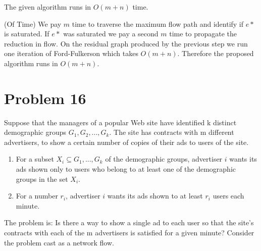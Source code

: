\documentclass{amsart}
\theoremstyle{definition}
\theoremstyle{remark}
\numberwithin{equation}{section}
\begin{document}
\claimstar The given algorithm runs in $O(m+n)$ time.

\proof (Of Time) We pay $m$ time to traverse the maximum flow path and identify if $e*$ is saturated. If $e*$ was saturated we pay a second $m$ time to propagate the reduction in flow. On the residual graph produced by the previous step we run one iteration of Ford-Fulkerson which takes $O(m+n)$. Therefore the proposed algorithm runs in $O(m+n)$.

\section{Problem 16}
Suppose that the managers of a popular Web site have identified k distinct demographic groups $G_1, G_2, . . . , G_k$. The site has contracts with m different advertisers, to show a certain number of copies of their ads to users of the site.

\begin{enumerate}
  \item For a subset $X_i \subseteq {G_1, . . . , G_k}$ of the demographic groups, advertiser $i$ wants its ads shown only to users who belong to at least one of the demographic groups in the set $X_i$.
  \item For a number $r_i$, advertiser $i$ wants its ads shown to at least $r_i$ users each minute.
\end{enumerate}

The problem is: Is there a way to show a single ad to each user so that the site’s contracts with each of the m advertisers is satisfied for a given minute? Consider the problem cast as a network flow.
\end{document}
